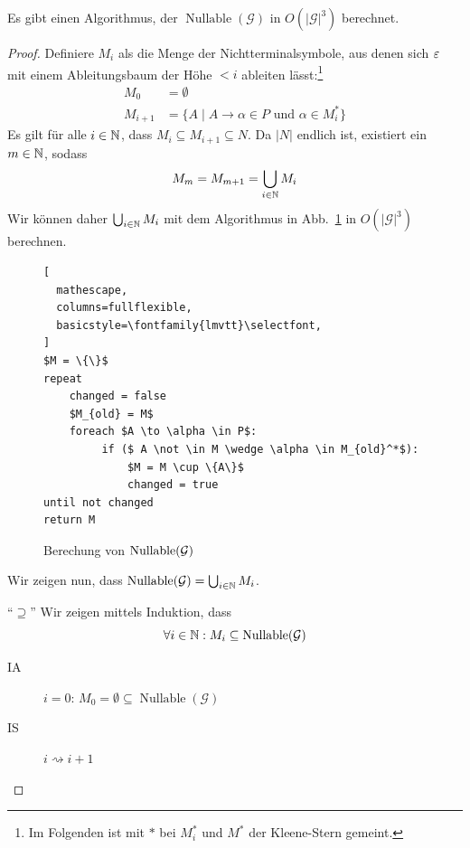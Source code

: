 \begin{Satz}\label{satz:3.nullable}
  Es gibt einen Algorithmus, der $\operatorname{Nullable}(\mathcal{G})$ in $O(|\mathcal{G}|^3)$ berechnet.
\end{Satz}
\begin{proof}
  Definiere $M_i$ als die Menge der Nichtterminalsymbole, aus denen sich
  $\varepsilon$ mit einem Ableitungsbaum der Höhe $< i$ ableiten lässt:\footnote{
  Im Folgenden ist mit $*$ bei $M_i^*$ und $M^*$ der Kleene-Stern gemeint.} 
  \begin{align*}
    M_0 &= \emptyset \\
    M_{i+1} &= \{ A \mid A \to \alpha \in P \text{ und }
              \alpha \in M_i^* \}
  \end{align*}
  Es gilt für alle $i \in \mathbb{N}$, dass $M_i \subseteq M_{i+1} \subseteq N$.
  Da $|N|$ endlich ist, existiert ein $m \in \mathbb{N}$, sodass
  \begin{displaymath}
    M_m = M_{m+1} = \bigcup_{i \in \mathbb{N}} M_i
  \end{displaymath}
  Wir können daher $\bigcup_{i \in \mathbb{N}} M_i$ mit dem Algorithmus in
  Abb.~\ref{fig:algorithm-nullable} in $O(|\mathcal{G}|^3)$ berechnen. 
  
  \begin{figure}[tp]
  \begin{minipage}{7cm}
  \begin{lstlisting}[
  mathescape,
  columns=fullflexible,
  basicstyle=\fontfamily{lmvtt}\selectfont,
]
$M = \{\}$
repeat
    changed = false
    $M_{old} = M$
    foreach $A \to \alpha \in P$:
         if ($ A \not \in M \wedge \alpha \in M_{old}^*$):
             $M = M \cup \{A\}$
             changed = true
until not changed
return M
\end{lstlisting}
\end{minipage}
\caption{Berechung von $\operatorname{Nullable} (\mathcal{G})$}
\label{fig:algorithm-nullable}
\end{figure}

  Wir zeigen nun, dass $\operatorname{Nullable}(\mathcal{G}) = \bigcup_{i \in \mathbb{N}} M_i$.

  \medskip
  
  "`$\supseteq$"'\quad
  Wir zeigen mittels Induktion, dass 
  $$\forall i \in \mathbb{N}: M_i \subseteq \operatorname{Nullable}(\mathcal{G})$$
  \begin{description}
  \item[IA] $i = 0$: $M_0 = \emptyset \subseteq \operatorname{Nullable}(\mathcal{G})$
  \item[IS] $i \rightsquigarrow i+1$


\end{description}
\end{proof}
